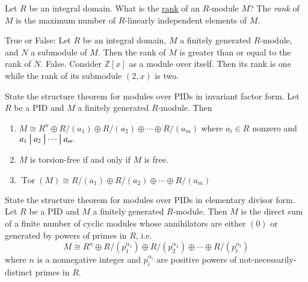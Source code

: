 \documentclass[avery5371,grid]{flashcards}
\newcommand{\Z}{\mathbb{Z}}
\newcommand{\divides}{\bigm|}
\DeclareMathOperator{\Tor}{Tor}
\begin{document}
\begin{flashcard}[Modules]{Let $R$ be an integral domain. What is the \underline{rank} of an $R$-module $M$?}
 The \emph{rank} of $M$ is the maximum number of $R$-linearly independent elements of $M$.
\end{flashcard}

\begin{flashcard}[Modules]{True or False: Let $R$ be an integral domain, $M$ a finitely generated $R$-module, and $N$ a submodule of $M$. Then the rank of $M$ is greater than or equal to the rank of $N$.}
 False. Consider $\Z[x]$ as a module over itself. Then its rank is one while the rank of its submodule $(2,x)$ is two. \\
 
\end{flashcard}

\begin{flashcard}[Modules]{State the structure theorem for modules over PIDs in invariant factor form.}
 Let $R$ be a PID and $M$ a finitely generated $R$-module. Then
 \begin{enumerate}
      \item $M \cong R^n \oplus R/(a_1) \oplus R/(a_2) \oplus \cdots \oplus R/(a_m)$ where $a_i \in R$ nonzero and $a_1 \divides a_2 \divides \cdots \divides a_m.$
      \item $M$ is torsion-free if and only if $M$ is free.
      \item $\Tor(M) \cong R/(a_1) \oplus R/(a_2) \oplus \cdots \oplus R/(a_m)$
 \end{enumerate}
\end{flashcard}

\begin{flashcard}[Modules]{State the structure theorem for modules over PIDs in elementary divisor form.}
 Let $R$ be a PID and $M$ a finitely generated $R$-module. Then $M$ is the direct sum of a finite number of cyclic modules whose annihilators are either $(0)$ or generated by powers of primes in $R$, i.e.
 $$
 M \cong R^n \oplus R/(p_1^{\alpha_1}) \oplus R/(p_2^{\alpha_2}) \oplus \cdots \oplus R/(p_t^{\alpha_t})
 $$
 where $n$ is a nonnegative integer and $p_i^{\alpha_i}$ are positive powers of not-necessarily-distinct primes in $R$.
\end{flashcard}
\end{document}

